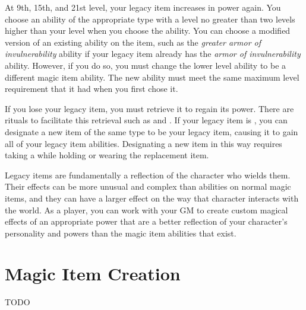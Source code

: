     At 9th, 15th, and 21st level, your legacy item increases in power again.
    You choose an ability of the appropriate type with a level no greater than two levels higher than your level when you choose the ability.
    You can choose a modified version of an existing ability on the item, such as the \textit{greater armor of invulnerability} ability if your legacy item already has the \textit{armor of invulnerability} ability.
    However, if you do so, you must change the lower level ability to be a different magic item ability.
    The new ability must meet the same maximum level requirement that it had when you first chose it.

    If you lose your legacy item, you must retrieve it to regain its power.
    There are rituals to facilitate this retrieval such as  and .
    If your legacy item is , you can designate a new item of the same type to be your legacy item, causing it to gain all of your legacy item abilities.
    Designating a new item in this way requires taking a  while holding or wearing the replacement item.

        Legacy items are fundamentally a reflection of the character who wields them.
        Their effects can be more unusual and complex than abilities on normal magic items, and they can have a larger effect on the way that character interacts with the world.
        As a player, you can work with your GM to create custom magical effects of an appropriate power that are a better reflection of your character's personality and powers than the magic item abilities that exist.

\section{Magic Item Creation}\label{Magic Item Creation}

    TODO
